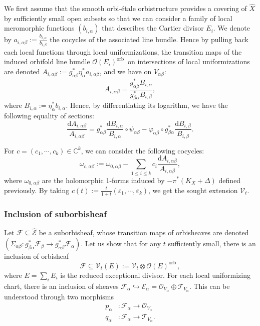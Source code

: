\documentclass[12pt,a4paper]{amsart}
\newcommand{\C}{\mathbb{C}}
\newcommand{\orb}{\mathrm{orb}\,}
\theoremstyle{plain}
\theoremstyle{definition}
\begin{document}
We first assume that the smooth orbi-\'etale orbistructure provides a covering of $\widehat{X}$ by sufficiently small open subsets so that we can consider a family of local meromorphic functions $(b_{i,\alpha})$ that describes the Cartier divisor $E_i$. We denote by $a_{i, \alpha\beta} := \frac{b_{i,\alpha}}{b_{i, \beta}}$ the cocycles of the associated line bundle.
Hence by pulling back each local functions through local uniformizations, the transition maps of the induced orbifold line bundle $\mathcal{O}(E_i)^\orb$ on intersections of local uniformizations are denoted $A_{i, \alpha\beta} := g_{\alpha\beta}^*\eta_\alpha^*a_{i, \alpha\beta}$, and we have on $V_{\alpha\beta}$:
$$
A_{i, \alpha\beta} = \frac{g_{\alpha\beta}^* B_{i,\alpha}}{g_{\beta\alpha}^* B_{i, \beta}},
$$
where $B_{i, \alpha} := \eta_\alpha^*b_{i, \alpha}$. Hence, by differentiating its logarithm, we have the following equality of sections:
$$
\frac{\mathrm{d}A_{i, \alpha\beta}}{A_{i, \alpha\beta}} =  g_{\alpha\beta}^*\frac{\mathrm{d} B_{i,\alpha}}{B_{i,\alpha}}  \circ \psi_{\alpha\beta} - \varphi_{\alpha\beta} \circ g_{\beta\alpha}^*\frac{\mathrm{d}B_{i, \beta}}{B_{i,\beta}}.
$$



For $c = (c_1, \cdots, c_k) \in \C^k$, we can consider the following cocycles:
$$
\omega_{c, \alpha\beta} := \omega_{0, \alpha\beta} - \sum_{1 \leq i \leq k}  c_i \frac{\mathrm{d}A_{i, \alpha\beta}}{A_{i, \alpha\beta}},
$$
where $\omega_{0, \alpha\beta}$ are the holomorphic 1-forms induced by $-\pi^*(K_X + \Delta)$ defined previously. By taking $c(t) := \frac{t}{1+t}(\varepsilon_1, \cdots, \varepsilon_k)$, we get the sought extension $\mathcal{V}_t$.

\subsubsection{Inclusion of suborbisheaf}\label{Inclusion of suborbisheaf}

Let $\mathcal{F} \subseteq \widehat{\mathcal{E}}$ be a suborbisheaf, whose transition maps of orbisheaves are denoted $(\Sigma_{\alpha\beta} : g_{\beta\alpha}^* \mathcal{F}_\beta \longrightarrow g_{\alpha\beta}^* \mathcal{F}_\alpha)$. Let us show that for any $t$ sufficiently small, there is an inclusion of orbisheaf
$$
\mathcal{F} \subseteq \mathcal{V}_t(E) := \mathcal{V}_t \otimes \mathcal{O}(E)^\orb,
$$
where $E = \sum_i E_i$ is the reduced exceptional divisor. For each local uniformizing chart, there is an inclusion  of sheaves $\mathcal{F}_\alpha \hookrightarrow \mathcal{E}_\alpha = \mathcal{O}_{V_\alpha} \oplus \mathcal{T}_{V_\alpha}$. This can be understood through two morphisms
\begin{align*}
    p_\alpha & : \mathcal{F}_\alpha \longrightarrow \mathcal{O}_{V_\alpha} \\
    q_\alpha & : \mathcal{F}_\alpha \longrightarrow \mathcal{T}_{V_\alpha}.  
\end{align*}
\end{document}
